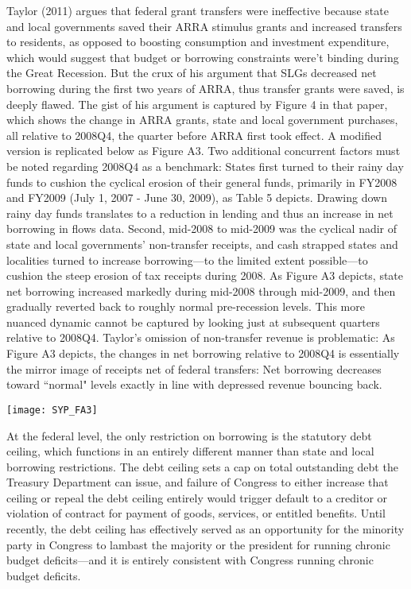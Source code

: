 \documentclass[12pt,letterpaper]{article}
\begin{document}
Taylor (2011) argues that federal grant transfers were ineffective because state and local governments saved their ARRA stimulus grants and increased transfers to residents, as opposed to boosting consumption and investment expenditure, which would suggest that budget or borrowing constraints were't binding during the Great Recession. But the crux of his argument that SLGs decreased net borrowing during the first two years of ARRA, thus transfer grants were saved, is deeply flawed. The gist of his argument is captured by Figure 4 in that paper, which shows the change in ARRA grants, state and local government purchases, all relative to 2008Q4, the quarter before ARRA first took effect. A modified version is replicated below as Figure A3. Two additional concurrent factors must be noted regarding 2008Q4 as a benchmark: States first turned to their rainy day funds to cushion the cyclical erosion of their general funds, primarily in FY2008 and FY2009 (July 1, 2007 - June 30, 2009), as Table 5 depicts. Drawing down rainy day funds translates to a reduction in lending and thus an increase in net borrowing in flows data. Second, mid-2008 to mid-2009 was the cyclical nadir of state and local governments' non-transfer receipts, and cash strapped states and localities turned to increase borrowing---to the limited extent possible---to cushion the steep erosion of tax receipts during 2008. As Figure A3 depicts, state net borrowing increased markedly during mid-2008 through mid-2009, and then gradually reverted back to roughly normal pre-recession levels. This more nuanced dynamic cannot be captured by looking just at subsequent quarters relative to 2008Q4. Taylor's omission of non-transfer revenue is problematic: As Figure A3 depicts, the changes in net borrowing relative to 2008Q4 is essentially the mirror image of receipts net of federal transfers: Net borrowing decreases toward ``normal" levels exactly in line with depressed revenue bouncing back. 

\begin{center}
\texttt{[image: SYP\_FA3]}
\end{center}

At the federal level, the only restriction on borrowing is the statutory debt ceiling, which functions in an entirely different manner than state and local borrowing restrictions. The debt ceiling sets a cap on total outstanding debt the Treasury Department can issue, and failure of Congress to either increase that ceiling or repeal the debt ceiling entirely would trigger default to a creditor or violation of contract for payment of goods, services, or entitled benefits. Until recently, the debt ceiling has effectively served as an opportunity for the minority party in Congress to lambast the majority or the president for running chronic budget deficits---and it is entirely consistent with Congress running chronic budget deficits.
\end{document}
